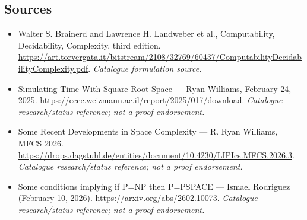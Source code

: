 \documentclass[11pt,a4paper]{article}
\begin{document}
\subsection{Sources}
\begin{itemize}\raggedright
\item[\textnormal{[S1]}]\hypertarget{source:statement:1}{} Walter S. Brainerd and Lawrence H. Landweber et al., Computability, Decidability, Complexity, third edition.
\url{https://art.torvergata.it/bitstream/2108/32769/60437/ComputabilityDecidabilityComplexity.pdf}.
{\small\textit{Catalogue formulation source.}}
\item[\textnormal{[S2]}]\hypertarget{source:statement:2}{} Simulating Time With Square-Root Space — Ryan Williams, February 24, 2025.
\url{https://eccc.weizmann.ac.il/report/2025/017/download}.
{\small\textit{Catalogue research/status reference; not a proof endorsement.}}
\item[\textnormal{[S3]}]\hypertarget{source:statement:3}{} Some Recent Developments in Space Complexity — R. Ryan Williams, MFCS 2026.
\url{https://drops.dagstuhl.de/entities/document/10.4230/LIPIcs.MFCS.2026.3}.
{\small\textit{Catalogue research/status reference; not a proof endorsement.}}
\item[\textnormal{[S4]}]\hypertarget{source:statement:4}{} Some conditions implying if P=NP then P=PSPACE — Ismael Rodriguez (February 10, 2026).
\url{https://arxiv.org/abs/2602.10073}.
{\small\textit{Catalogue research/status reference; not a proof endorsement.}}
\end{itemize}

\end{document}

